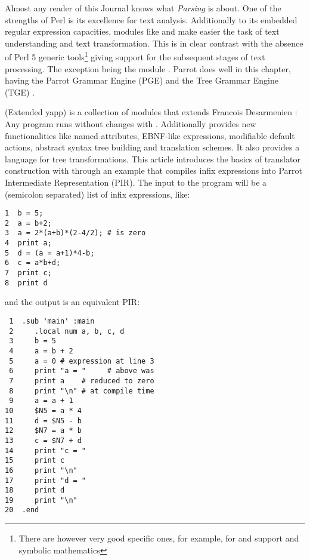 Almost any reader of this Journal knows what {\it Parsing} is about.
One of the strengths of Perl is its excellence for text analysis. 
Additionally to its embedded regular expression capacities, modules 
like  \cite{conwayrd} and 
 \cite{desarmenien} make easier the task of text 
understanding and text transformation.
This is in clear contrast with the absence of Perl 5 
generic tools\footnote{There are however very good specific ones,
for example, for  and  support and 
symbolic mathematics
}
giving support for the subsequent stages
of text processing.
The exception being the module 
\cite{luke}. Parrot does well in this 
chapter, having the Parrot Grammar Engine (PGE) \cite{michaud}
and the Tree Grammar Engine (TGE)
\cite{randaltge}.

 (Extended yapp) is a collection of modules
that extends Francois Desarmenien  :
Any  program runs without changes with .
Additionally  provides new 
functionalities like named attributes,
EBNF-like expressions, modifiable default actions,
abstract syntax tree building and translation schemes. 
It also provides a language for tree transformations.
This article introduces the basics of 
translator construction with  through an
example that compiles infix expressions into Parrot 
Intermediate Representation (PIR)\cite{randal04}.
The input to the program will be a (semicolon separated)
list of infix expressions, like:

\begin{verbatim}
1  b = 5;
2  a = b+2;
3  a = 2*(a+b)*(2-4/2); # is zero
4  print a;
5  d = (a = a+1)*4-b;
6  c = a*b+d;
7  print c;
8  print d
\end{verbatim}

and the output is an equivalent
PIR: 
\begin{verbatim}
 1  .sub 'main' :main
 2     .local num a, b, c, d
 3     b = 5
 4     a = b + 2
 5     a = 0 # expression at line 3 
 6     print "a = "     # above was
 7     print a    # reduced to zero
 8     print "\n" # at compile time
 9     a = a + 1
10     $N5 = a * 4
11     d = $N5 - b
12     $N7 = a * b
13     c = $N7 + d
14     print "c = "
15     print c
16     print "\n"
17     print "d = "
18     print d
19     print "\n"
20  .end
\end{verbatim}
